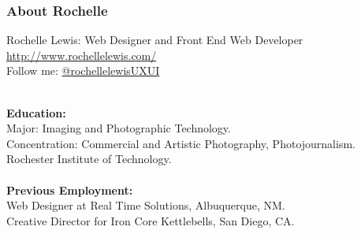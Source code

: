 \documentclass[aspectratio=169]{beamer}
\begin{document}
\begin{frame}
\frametitle{About Rochelle}
Rochelle Lewis: Web Designer and Front End Web Developer\\
\href{http://www.rochellelewis.com/}{http://www.rochellelewis.com/}\\
Follow me:  \href{https://twitter.com/rochellelewisUXUI}{@rochellelewisUXUI}

\mbox{}\\

\textbf{Education:}\\
Major: Imaging and Photographic Technology.\\
Concentration: Commercial and Artistic Photography, Photojournalism.\\
Rochester Institute of Technology.\\

\mbox{}\\

\textbf{Previous Employment:}\\
Web Designer at Real Time Solutions, Albuquerque, NM.\\
Creative Director for Iron Core Kettlebells, San Diego, CA.
\end{frame}
\end{document}
